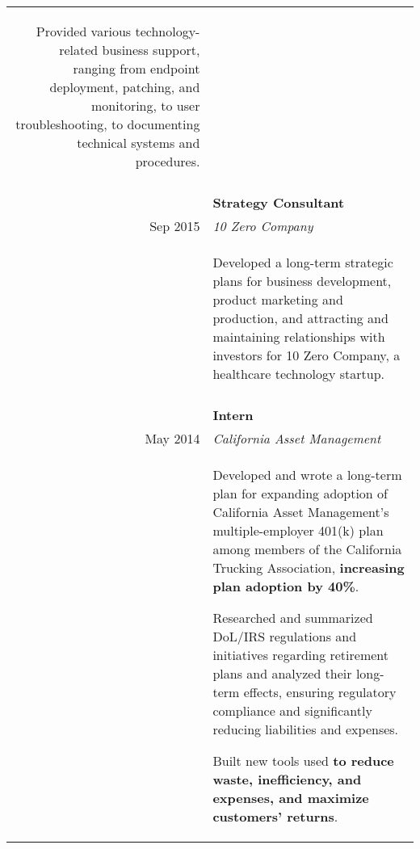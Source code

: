 \documentclass[10pt]{article}
\newcommand{\afterlistspace}[0]{\vspace{-1.5em}}
\begin{document}
\begin{tabular}{r|p{16cm}}
\begin{itemize}
{            \item Provided various technology-related business support, ranging from endpoint deployment, patching, and monitoring, to user troubleshooting, to documenting technical systems and procedures.
        }
        \afterlistspace
    \end{itemize}
    
    \\
    \multicolumn{2}{c}{}
    \\
    
\begin{comment}

    Dec 2015 & \textbf{Strategy Consultant}
    \\
    Sep 2015 & \emph{10 Zero Company}
    \\
    & \begin{itemize}
        \footnotesize{
            \item Developed a long-term strategic plans for business development, product marketing and production, and attracting and maintaining relationships with investors for 10 Zero Company, a healthcare technology startup.
        }
        \afterlistspace
    \end{itemize}

    \\
    \multicolumn{2}{c}{}
    \\

\end{comment}

    Aug 2014 & \textbf{Intern}
    \\
    May 2014 & \emph{California Asset Management}
    \\
    & \begin{itemize}
        \footnotesize{

            \item Developed and wrote a long-term plan for expanding adoption of California Asset Management's multiple-employer 401(k) plan among members of the California Trucking Association, \textbf{increasing plan adoption by 40\%}.
            
            \item Researched and summarized DoL/IRS regulations and initiatives regarding retirement plans
            and analyzed their long-term effects, ensuring regulatory compliance and significantly reducing liabilities and expenses.
            
            \item Built new tools used \textbf{to reduce waste, inefficiency, and expenses, and maximize customers' returns}.
        
        }

        \afterlistspace
    \end{itemize}

\end{tabular}
\end{document}

